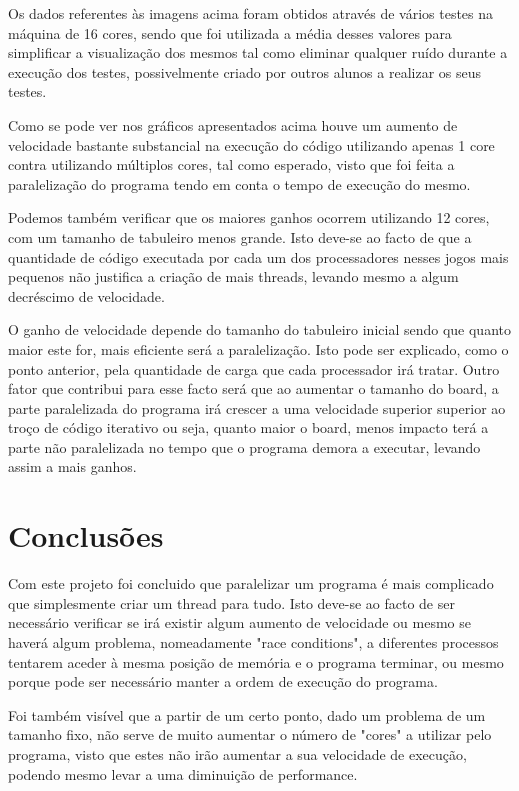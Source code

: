\documentclass[a4paper]{article}
\begin{document}
    Os dados referentes às imagens acima foram obtidos através de vários testes na máquina de 16 cores, sendo que foi utilizada a média desses valores para simplificar a visualização dos mesmos tal como eliminar qualquer ruído durante a execução dos testes, possivelmente criado por outros alunos a realizar os seus testes.
    
    Como se pode ver nos gráficos apresentados acima houve um aumento de velocidade bastante substancial na execução do código utilizando apenas 1 core contra utilizando múltiplos cores, tal como esperado, visto que foi feita a paralelização do programa tendo em conta o tempo de execução do mesmo.
    
    
    Podemos também verificar que os maiores ganhos ocorrem utilizando 12 cores, com um tamanho de tabuleiro menos grande. Isto deve-se ao facto de que a quantidade de código executada por cada um dos processadores nesses jogos mais pequenos não justifica a criação de mais threads, levando mesmo a algum decréscimo de velocidade. 
    
    O ganho de velocidade depende do tamanho do tabuleiro inicial sendo que quanto maior este for, mais eficiente será a paralelização. Isto pode ser explicado, como o ponto anterior, pela quantidade de carga que cada processador irá tratar. Outro fator que contribui para esse facto será que ao aumentar o tamanho do board, a parte paralelizada do programa irá crescer a uma velocidade superior superior ao troço de código iterativo ou seja, quanto maior o board, menos impacto terá a parte não paralelizada no tempo que o programa demora a executar, levando assim a mais ganhos.
    
    \section{Conclusões}
    Com este projeto foi concluido que paralelizar um programa é mais complicado que simplesmente criar um thread para tudo. Isto deve-se ao facto de ser necessário verificar se irá existir algum aumento de velocidade ou mesmo se haverá algum problema, nomeadamente "race conditions", a diferentes processos tentarem aceder à mesma posição de memória e o programa terminar, ou mesmo porque pode ser necessário manter a ordem de execução do programa. 
    
    Foi também visível que a partir de um certo ponto, dado um problema de um tamanho fixo, não serve de muito aumentar o número de "cores" a utilizar pelo programa, visto que estes não irão aumentar a sua velocidade de execução, podendo mesmo levar a uma diminuição de performance.  
    
\end{document}
